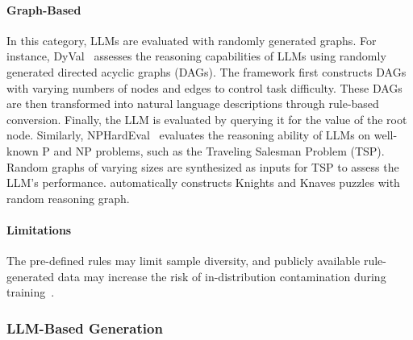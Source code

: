 \paragraph{Graph-Based}
In this category, LLMs are evaluated with randomly generated graphs.
For instance, DyVal~\citep{zhu2024dyval} assesses the reasoning capabilities of LLMs using randomly generated directed acyclic graphs (DAGs). 
The framework first constructs DAGs with varying numbers of nodes and edges to control task difficulty. 
These DAGs are then transformed into natural language descriptions through rule-based conversion. Finally, the LLM is evaluated by querying it for the value of the root node.
Similarly, NPHardEval~\citep{fan-etal-2024-nphardeval} evaluates the reasoning ability of LLMs on well-known P and NP problems, such as the Traveling Salesman Problem (TSP). 
Random graphs of varying sizes are synthesized as inputs for TSP to assess the LLM's performance.
\citet{xie2024memorization} automatically constructs Knights and Knaves puzzles with random reasoning graph.


\paragraph{Limitations} 
The pre-defined rules may limit sample diversity, and publicly available rule-generated data may increase the risk of in-distribution contamination during training~\citep{tu2024dice}.



\subsubsection{LLM-Based Generation}

